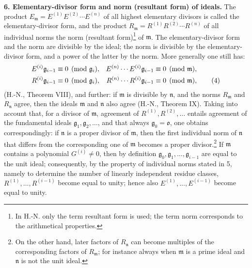 \documentclass[11pt]{article}
\providecommand{\frakm}{\mathfrak m}
\providecommand{\frakn}{\mathfrak n}
\providecommand{\frakg}{\mathfrak g}
\providecommand{\frako}{\mathfrak o}
\begin{document}
\textbf{6. Elementary-divisor form and norm (resultant form) of ideals.} The product $E_\frakm=E^{(1)}E^{(2)}\cdots E^{(n)}$ of all highest elementary divisors is called the elementary-divisor form, and the product $R_\frakm=R^{(1)}R^{(2)}\cdots R^{(n)}$ of all individual norms the norm (resultant form)\footnote{In H.-N. only the term resultant form is used; the term norm corresponds to the arithmetical properties.} of $\frakm$. The elementary-divisor form and the norm are divisible by the ideal; the norm is divisible by the elementary-divisor form, and a power of the latter by the norm. More generally one still has:
\begin{align}
 E^{(i)}\frakg_{i-1}&\equiv0\pmod{\frakg_i},
& E^{(n)}\cdots E^{(i)}\frakg_{i-1}&\equiv0\pmod{\frakm},\notag\\
 R^{(i)}\frakg_{i-1}&\equiv0\pmod{\frakg_i},
& R^{(n)}\cdots R^{(i)}\frakg_{i-1}&\equiv0\pmod{\frakm}, \tag{4}
\end{align}
(H.-N., Theorem VIII), and further: if $\frakm$ is divisible by $\frakn$, and the norms $R_\frakm$ and $R_\frakn$ agree, then the ideals $\frakm$ and $\frakn$ also agree (H.-N., Theorem IX). Taking into account that, for a divisor of $\frakm$, agreement of $R^{(1)},R^{(2)},\ldots$ entails agreement of the fundamental ideals $\frakg_1,\frakg_2,\ldots$, and that always $\frakg_0=\frako$, one obtains correspondingly: if $\frakn$ is a proper divisor of $\frakm$, then the first individual norm of $\frakn$ that differs from the corresponding one of $\frakm$ becomes a proper divisor.\footnote{On the other hand, later factors of $R_\frakn$ can become multiples of the corresponding factors of $R_\frakm$; for instance always when $\frakm$ is a prime ideal and $\frakn$ is not the unit ideal.} If $\frakm$ contains a polynomial $G^{(i)}\ne0$, then by definition $\frakg_0,\frakg_1,\ldots,\frakg_{i-1}$ are equal to the unit ideal; consequently, by the property of individual norms stated in 5, namely to determine the number of linearly independent residue classes, $R^{(1)},\ldots,R^{(i-1)}$ become equal to unity; hence also $E^{(1)},\ldots,E^{(i-1)}$ become equal to unity.
\end{document}

